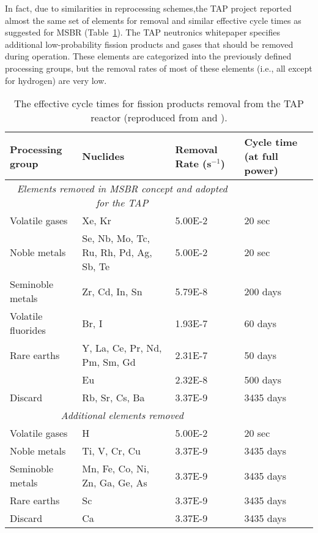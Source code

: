 In fact, due to similarities in reprocessing schemes,the \gls{TAP} project 
reported almost the same set of elements for removal and similar effective 
cycle times as suggested for \gls{MSBR} (Table~\ref{tab:reprocessing_list}). 
The \gls{TAP} neutronics whitepaper specifies additional low-probability 
fission products and gases that should be removed during operation. These 
elements are categorized into the previously defined processing groups, but 
the removal rates of most of these elements (i.e., all except for hydrogen) 
are very low.
\begin{table}[ht!]
	\centering
	\caption{The effective cycle times for fission products removal  from the 
	\gls{TAP} reactor (reproduced from \cite{betzler_implementation_2017} and 
	\cite{transatomic_power_corporation_neutronics_2016}).}
	\begin{tabular}{p{} p{} p{} 
	p{}}
		\hline 
		Processing group & \qquad\qquad\qquad Nuclides & Removal Rate 
		(s$^{-1}$) & Cycle time (at full power) \\ [5pt] \hline 
		\multicolumn{3}{c}{\textit{Elements removed in \gls{MSBR} concept and 
		adopted for the \gls{TAP}} \cite{robertson_conceptual_1971}} \\
		Volatile gases & Xe, Kr								  & 5.00E-2 & 20 
		sec \\ [5pt]
		Noble metals & Se, Nb, Mo, Tc, Ru, Rh, Pd, Ag, Sb, Te & 5.00E-2 & 20 
		sec \\ [5pt]
		Seminoble metals & Zr, Cd, In, Sn	  				  & 5.79E-8 & 200 
		days \\ [5pt]
		Volatile fluorides & Br, I 							  & 1.93E-7 & 60 
		days \\ [5pt]
		Rare earths & Y, La, Ce, Pr, Nd, Pm, Sm, Gd           & 2.31E-7 & 50 
		days \\ [5pt]
		\qquad & Eu & 2.32E-8 & 500 days \\ [5pt]
		Discard & Rb, Sr, Cs, Ba & 3.37E-9 & 3435 days \\ [5pt] 
		\hline
		
		\multicolumn{3}{c}{\textit{Additional elements removed} 
		\cite{transatomic_power_corporation_neutronics_2016, 
		betzler_implementation_2017}  } \\
		Volatile gases & H								  	& 5.00E-2 & 20 
		sec    \\ [5pt]
		Noble metals & Ti, V, Cr, Cu						& 3.37E-9 & 3435 
		days \\ [5pt]
		Seminoble metals & Mn, Fe, Co, Ni, Zn, Ga, Ge, As   & 3.37E-9 & 3435 
		days \\ [5pt]
		Rare earths & Sc									& 3.37E-9 & 3435 
		days \\ [5pt]
		Discard & Ca										& 3.37E-9 & 3435 
		days \\ [5pt] 
		\hline
	\end{tabular}
	\label{tab:reprocessing_list}
	\vspace{-0.9em}
\end{table}
